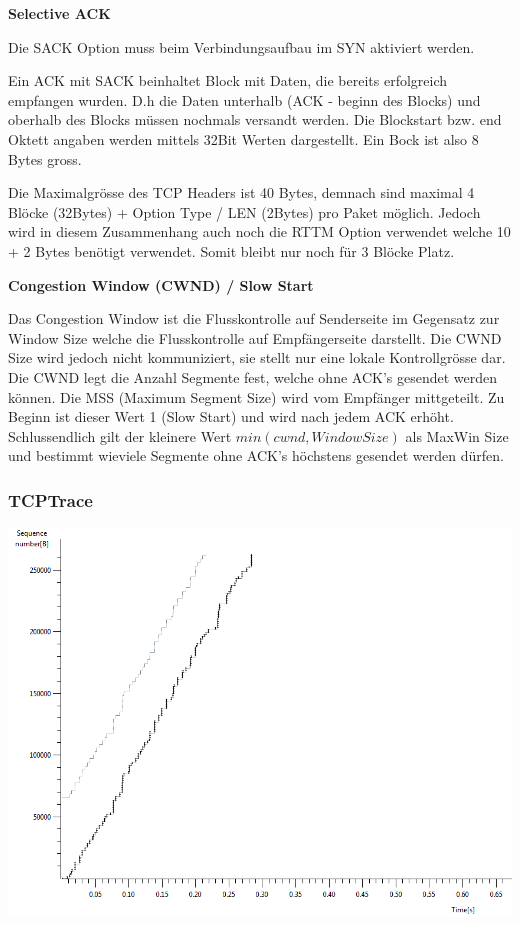 \textbf{Selective ACK}

Die SACK Option muss beim Verbindungsaufbau im SYN aktiviert werden. 

Ein ACK mit SACK beinhaltet Block mit Daten, die bereits erfolgreich empfangen
wurden. D.h die Daten unterhalb (ACK - beginn des Blocks) und oberhalb des
Blocks müssen nochmals versandt werden. Die Blockstart bzw. end Oktett angaben
werden mittels 32Bit Werten dargestellt. Ein Bock ist also 8 Bytes gross.

Die Maximalgrösse des TCP Headers ist 40 Bytes, demnach sind maximal 4 Blöcke
(32Bytes) + Option Type / LEN (2Bytes) pro Paket möglich. Jedoch wird in diesem
Zusammenhang auch noch die RTTM Option verwendet welche 10 + 2 Bytes benötigt
verwendet. Somit bleibt nur noch für 3 Blöcke Platz.

\textbf{Congestion Window (CWND) / Slow Start}

Das Congestion Window ist die Flusskontrolle auf Senderseite im Gegensatz zur
Window Size welche die Flusskontrolle auf Empfängerseite darstellt. Die CWND
Size wird jedoch nicht kommuniziert, sie stellt nur eine lokale Kontrollgrösse
dar. Die CWND legt die Anzahl Segmente fest, welche ohne ACK's gesendet werden
können. Die MSS (Maximum Segment Size) wird vom Empfänger mittgeteilt. Zu Beginn
ist dieser Wert 1 (Slow Start) und wird nach jedem ACK erhöht. Schlussendlich
gilt der kleinere Wert $min(cwnd,WindowSize)$ als MaxWin Size und bestimmt
wieviele Segmente ohne ACK's höchstens gesendet werden dürfen.

\subsubsection{TCPTrace}

\includegraphics[scale=0.45]{media/tcptraceUpload.png}

